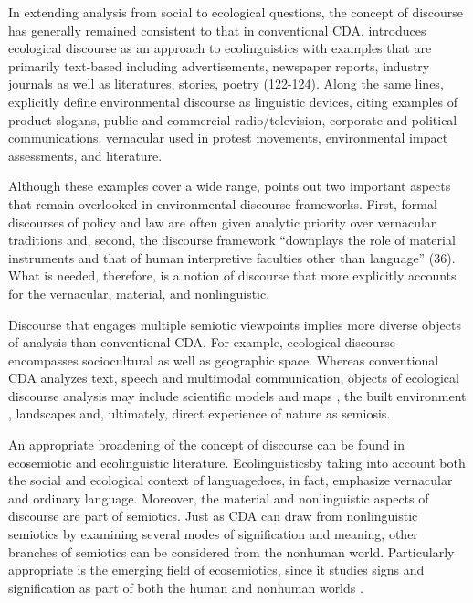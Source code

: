 In extending analysis from social to ecological questions, the concept of discourse has generally remained consistent to that in conventional CDA. \cite*{Stibbe2014b} introduces ecological discourse as an approach to ecolinguistics with examples that are primarily text-based including advertisements, newspaper reports, industry journals as well as literatures, stories, poetry (122-124). Along the same lines, \cite*{Muhlhausler2006b} explicitly define environmental discourse as linguistic devices, citing examples of product slogans, public and commercial radio/television, corporate and political communications, vernacular used in protest movements, environmental impact assessments, and literature. 

Although these examples cover a wide range, \cite*{Jasanoff2004a} points out two important aspects that remain overlooked in environmental discourse frameworks. First, formal discourses of policy and law are often given analytic priority over vernacular traditions and, second, the discourse framework ``downplays the role of material instruments and that of human interpretive faculties other than language'' (36). What is needed, therefore, is a notion of discourse that more explicitly accounts for the vernacular, material, and nonlinguistic.

Discourse that engages multiple semiotic viewpoints implies more diverse objects of analysis than conventional CDA. For example, ecological discourse encompasses sociocultural as well as geographic space. Whereas conventional CDA analyzes text, speech and multimodal communication, objects of ecological discourse analysis may include scientific models and maps \citep[44-45]{Jasanoff2004a}, the built environment \citep{Rapoport1994}, landscapes and, ultimately, direct experience of nature as semiosis. 

An appropriate broadening of the concept of discourse can be found in ecosemiotic and ecolinguistic literature. Ecolinguistics\textemdash by taking into account both the social and ecological context of language\textemdash does, in fact, emphasize vernacular and ordinary language. Moreover, the material and nonlinguistic aspects of discourse are part of semiotics. Just as CDA can draw from nonlinguistic semiotics by examining several modes of signification and meaning, other branches of semiotics can be considered from the nonhuman world. Particularly appropriate is the emerging field of ecosemiotics, since it studies signs and signification as part of both the human and nonhuman worlds \citep{Noth1998a, Maran2014a}. 

